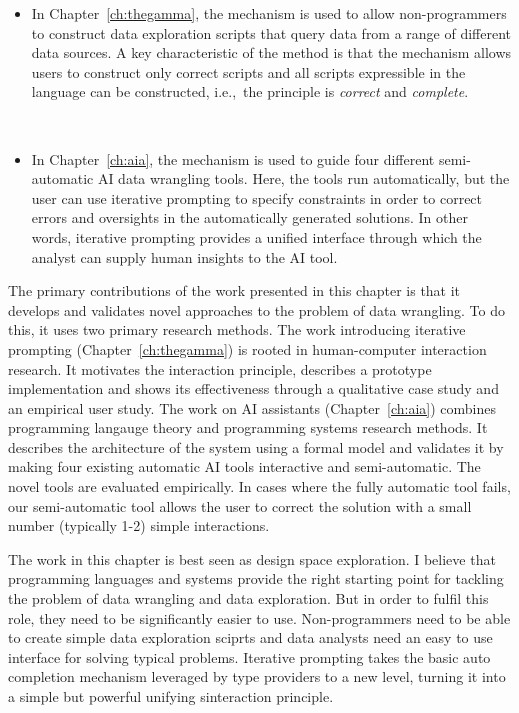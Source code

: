 \documentclass[fleqn,11pt]{report}
\theoremstyle{definition}
\newenvironment{nitemize}
{ \vspace{-0.4em}
  \begin{itemize}
    \setlength{\itemsep}{5pt}
    \setlength{\parskip}{0pt}
    \setlength{\parsep}{0pt} }
{ \end{itemize}
  \vspace{-0.4em} }
\begin{document}
\begin{nitemize}
\item In Chapter~\ref{ch:thegamma}, the mechanism is used to allow non-programmers to construct
  data exploration scripts that query data from a range of different data sources. A key
  characteristic of the method is that the mechanism allows users to construct only correct
  scripts and all scripts expressible in the language can be constructed, i.e.,~the principle
  is \emph{correct} and \emph{complete}.

~

\item In Chapter~\ref{ch:aia}, the mechanism is used to guide four different semi-automatic AI data
  wrangling tools. Here, the tools run automatically, but the user can use iterative prompting
  to specify constraints in order to correct errors and oversights in the automatically
  generated solutions. In other words, iterative prompting provides a unified interface through
  which the analyst can supply human insights to the AI tool.
\end{nitemize}

The primary contributions of the work presented in this chapter is that it develops and validates
novel approaches to the problem of data wrangling. To do this, it uses two primary research
methods. The work introducing iterative prompting (Chapter~\ref{ch:thegamma}) is rooted in
human-computer interaction research. It motivates the interaction principle, describes a prototype
implementation and shows its effectiveness through a qualitative case study and an empirical user
study. The work on AI assistants (Chapter~\ref{ch:aia}) combines programming langauge theory and
programming systems research methods. It describes the architecture of the system using a formal
model and validates it by making four existing automatic
AI tools interactive and semi-automatic. The novel tools are evaluated empirically. In cases where
the fully automatic tool fails, our semi-automatic tool allows the user to correct the solution
with a small number (typically 1-2) simple interactions.

The work in this chapter is best seen as design space exploration.
I believe that programming languages and systems provide the right starting point for tackling the
problem of data wrangling and data exploration. But in order to fulfil this role, they need to
be significantly easier to use. Non-programmers need to be able to create simple data exploration
sciprts and data analysts need an easy to use interface for solving typical problems.
Iterative prompting takes the basic auto completion mechanism leveraged by type providers
to a new level, turning it into a simple but powerful unifying sinteraction principle.
\end{document}
